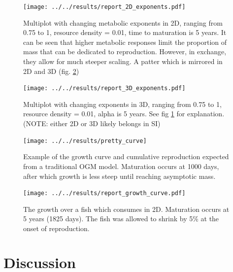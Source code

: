 \documentclass[a4paper, 11pt, hidelinks]{article} %
\begin{document}
	\begin{figure}[h!]
		
		\texttt{[image: ../../results/report\_2D\_exponents.pdf]}
		
		\caption{Multiplot with changing metabolic exponents in 2D, ranging from 0.75 to 1, resource density = 0.01, time to maturation is 5 years.  
		It can be seen that higher metabolic responses limit the proportion of mass that can be dedicated to reproduction.  However, in exchange, they allow for much steeper scaling.  A patter which is mirrored in 2D and 3D (fig. \ref{exponents3D})}
		\label{exponents2D}
	\end{figure}
		
	\begin{figure}[h!]
		
		\texttt{[image: ../../results/report\_3D\_exponents.pdf]}
		
		\caption{Multiplot with changing exponents in 3D, ranging from 0.75 to 1, resource density = 0.01, alpha is 5 years. See fig \ref{exponents2D} for explanation. (NOTE: either 2D or 3D likely belongs in SI) } %
		\label{exponents3D}
	\end{figure}
		
	\begin{figure}
		\centering %
		\texttt{[image: ../../results/pretty\_curve]}
		\caption{Example of the growth curve and cumulative reproduction expected from a traditional OGM model. Maturation occurs at 1000 days, after which growth is less steep until reaching asymptotic mass.  }
		\label{OGM_Curve}
	\end{figure}
	
	\begin{figure}
		
		\texttt{[image: ../../results/report\_growth\_curve.pdf]}
		\caption{The growth over a fish which consumes in 2D.  Maturation occurs at 5 years (1825 days).  The fish was allowed to shrink by 5\% at the onset of reproduction.}
		\label{growth_curve}
	\end{figure}



	\nolinenumbers
	
\section{Discussion}
	\linenumbers
	
\end{document}
